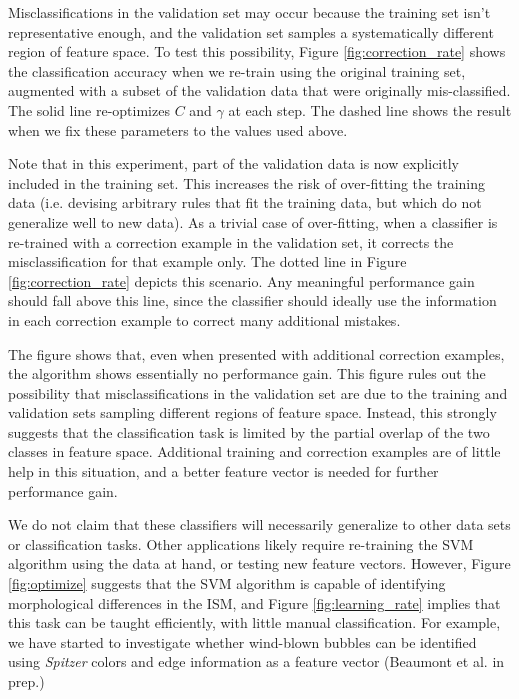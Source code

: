 Misclassifications in the validation set may occur because the training set isn't representative enough, and the validation set samples a systematically different region of feature space. To test this possibility, Figure \ref{fig:correction_rate} shows the classification accuracy when we re-train using the original training set, augmented with a subset of the validation data that were originally mis-classified. The solid line re-optimizes $C$ and $\gamma$ at each step. The dashed line shows the result when we fix these parameters to the values used above.

Note that in this experiment, part of the validation data is now explicitly included in the training set. This increases the risk of over-fitting the training data (i.e. devising arbitrary rules that fit the training data, but which do not generalize well to new data). As a trivial case of over-fitting, when a classifier is re-trained with a correction example in the validation set, it corrects the misclassification for that example only. The dotted line in Figure \ref{fig:correction_rate} depicts this scenario. Any meaningful performance gain should fall above this line, since the classifier should ideally use the information in each correction example to correct many additional mistakes.

The figure shows that, even when presented with additional correction examples, the algorithm shows essentially no performance gain. This figure rules out the possibility that misclassifications in the validation set are due to the training and validation sets sampling different regions of feature space. Instead, this strongly suggests that the classification task is limited by the partial overlap of the two classes in feature space. Additional training and correction examples are of little help in this situation, and a better feature vector is needed for further performance gain.

We do not claim that these classifiers will necessarily generalize to other data sets or classification tasks. Other applications likely require re-training the SVM algorithm using the data at hand, or testing new feature vectors. However, Figure \ref{fig:optimize} suggests that the SVM algorithm is capable of identifying morphological differences in the ISM, and Figure \ref{fig:learning_rate} implies that this task can be taught efficiently, with little manual classification. For example, we have started to investigate whether wind-blown bubbles can be identified using \textit{Spitzer} colors and edge information as a feature vector (Beaumont et al. in prep.)

